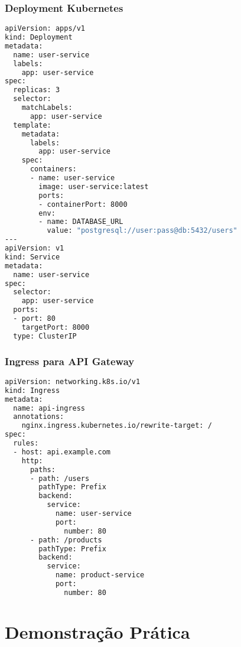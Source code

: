 \documentclass[aspectratio=169]{beamer}
\begin{document}
\begin{frame}[fragile]
    \frametitle{Deployment Kubernetes}
    \begin{lstlisting}[language=bash]
apiVersion: apps/v1
kind: Deployment
metadata:
  name: user-service
  labels:
    app: user-service
spec:
  replicas: 3
  selector:
    matchLabels:
      app: user-service
  template:
    metadata:
      labels:
        app: user-service
    spec:
      containers:
      - name: user-service
        image: user-service:latest
        ports:
        - containerPort: 8000
        env:
        - name: DATABASE_URL
          value: "postgresql://user:pass@db:5432/users"
---
apiVersion: v1
kind: Service
metadata:
  name: user-service
spec:
  selector:
    app: user-service
  ports:
  - port: 80
    targetPort: 8000
  type: ClusterIP
    \end{lstlisting}
\end{frame}

\begin{frame}[fragile]
    \frametitle{Ingress para API Gateway}
    \begin{lstlisting}[language=bash]
apiVersion: networking.k8s.io/v1
kind: Ingress
metadata:
  name: api-ingress
  annotations:
    nginx.ingress.kubernetes.io/rewrite-target: /
spec:
  rules:
  - host: api.example.com
    http:
      paths:
      - path: /users
        pathType: Prefix
        backend:
          service:
            name: user-service
            port:
              number: 80
      - path: /products
        pathType: Prefix
        backend:
          service:
            name: product-service
            port:
              number: 80
    \end{lstlisting}
\end{frame}

\section{Demonstração Prática}
\end{document}
